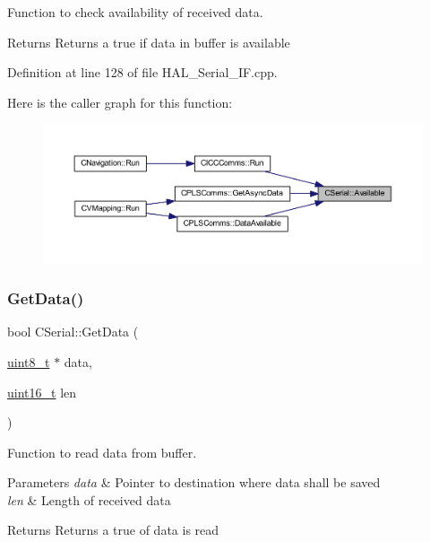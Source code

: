 Function to check availability of received data. 

\begin{DoxyReturn}{Returns}
Returns a true if data in buffer is available 
\end{DoxyReturn}


Definition at line 128 of file H\+A\+L\+\_\+\+Serial\+\_\+\+I\+F.\+cpp.

Here is the caller graph for this function\+:\nopagebreak
\begin{figure}[H]
\begin{center}
\leavevmode
\includegraphics[width=350pt]{class_c_serial_abb43734223d937a86e7616636ea16024_icgraph}
\end{center}
\end{figure}
\mbox{\label{class_c_serial_abad86c07f530569b2ceeea75bda485ad}} 
\subsubsection{\texorpdfstring{GetData()}{GetData()}}
{\footnotesize\ttfamily bool C\+Serial\+::\+Get\+Data (\begin{DoxyParamCaption}\item[{\mbox{\hyperlink{_a_d_a_s___types_8h_aba7bc1797add20fe3efdf37ced1182c5}{uint8\+\_\+t}} $\ast$}]{data,  }\item[{\mbox{\hyperlink{_a_d_a_s___types_8h_a1f1825b69244eb3ad2c7165ddc99c956}{uint16\+\_\+t}}}]{len }\end{DoxyParamCaption})}



Function to read data from buffer. 


\begin{DoxyParams}{Parameters}
{\em data} & Pointer to destination where data shall be saved \\
\hline
{\em len} & Length of received data \\
\hline
\end{DoxyParams}
\begin{DoxyReturn}{Returns}
Returns a true of data is read 
\end{DoxyReturn}



